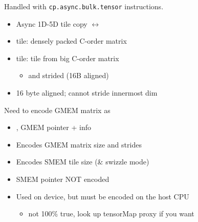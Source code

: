 \newpage
{}

\begin{minipage}[t]{0.48\textwidth}\fixminipage
Handled with \texttt{cp.async.bulk.tensor} instructions.

\begin{itemize}
\item Async 1D-5D tile copy $\leftrightarrow$
\item {} tile: densely packed C-order matrix
\item {} tile: tile from big C-order matrix
\begin{itemize}
  \item {} and strided (16B aligned)
\end{itemize}
\item 16 byte aligned; cannot stride innermost dim
\end{itemize}


Need to encode GMEM matrix as 
\begin{itemize}
  \item {}, GMEM pointer + info
  \item Encodes GMEM matrix size and strides
  \item Encodes SMEM tile size (\& swizzle mode)
  \item SMEM pointer NOT encoded
  \item Used on device, but must be encoded on the host CPU
  \begin{itemize}
    \item not 100\% true, look up tensorMap proxy if you want
  \end{itemize}
\end{itemize}

\end{minipage}
\hfill
